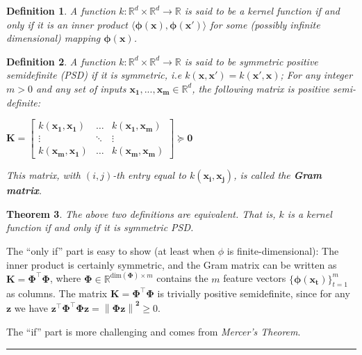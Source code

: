 \documentclass[twoside]{article}
\newcommand{\norm}[1]{\left\lVert #1 \right\rVert}
\newcounter{lecnum}
\newtheorem{theorem}{Theorem}[lecnum]
\newtheorem{definition}[theorem]{Definition}
\newenvironment{proof}{{\bf Proof:}}{\hfill\rule{2mm}{2mm}}
\begin{document}
\begin{definition}
A function $k : \mathbb{R}^d \times \mathbb{R}^d \rightarrow \mathbb{R}$ is said to be a kernel function if and only if it is an inner product $\langle \boldsymbol{\phi(x)}, \boldsymbol{\phi(x')} \rangle$  for some (possibly infinite dimensional) mapping $\boldsymbol{\phi(x)}$.
\end{definition}
\newpage
\begin{definition}
A function $k : \mathbb{R}^d \times \mathbb{R}^d \rightarrow \mathbb{R}$ is said to be symmetric positive semidefinite (PSD) if it is symmetric, i.e \: $k(\boldsymbol{x}, \boldsymbol{x'}) = k(\boldsymbol{x'}, \boldsymbol{x})$; For any integer $m > 0$ and any set of inputs $\boldsymbol{x_1,...,x_m }\in \mathbb{R}^d$, the following matrix is positive semi-definite:
\begin{center}
    $\boldsymbol{K} =
    \begin{bmatrix}
    k(\boldsymbol{x_1}, \boldsymbol{x_1}) & \hdots & k(\boldsymbol{x_1}, \boldsymbol{x_m})\\
    \vdots & \ddots & \vdots\\
    k(\boldsymbol{x_m}, \boldsymbol{x_1}) & \hdots & k(\boldsymbol{x_m}, \boldsymbol{x_m})
    \end{bmatrix}
    \succeq \boldsymbol{0}
$
\end{center}
This matrix, with $(i, j)$-th entry equal to $k(\boldsymbol{x_i}, \boldsymbol{x_j})$, is called the \textbf{Gram matrix}.
\end{definition}

\begin{theorem}
The above two definitions are equivalent. That is, $k$ is a kernel function if and only if it is symmetric PSD.
\end{theorem}
\begin{proof}
The “only if” part is easy to show (at least when $\phi$ is finite-dimensional): The inner product is certainly symmetric, and the Gram matrix can be written as $\boldsymbol{K = \Phi^\intercal\Phi}$, where $\boldsymbol{\Phi} \in \mathbb{R}^{\text{dim}(\boldsymbol{\Phi}) \times m}$ contains the $m$ feature vectors $\{\boldsymbol{\phi(x_t)}\}_{t = 1}^{m}$ as columns. The matrix $\boldsymbol{K = \Phi^\intercal\Phi}$  is trivially positive semidefinite, since for any $\boldsymbol{z}$ we have $\boldsymbol{z^\intercal\Phi^\intercal\Phi z} = \boldsymbol{\norm{\Phi z}^2} \geq 0$.\medskip

The “if” part is more challenging and comes from \textit{Mercer's Theorem}.
\end{proof}\medskip
\end{document}
